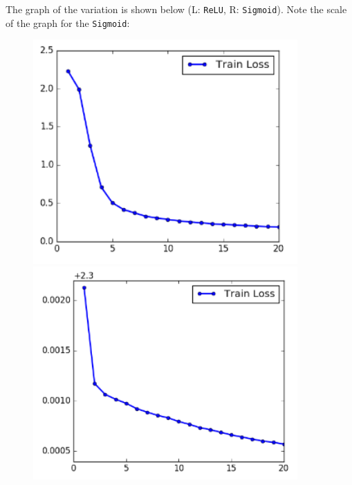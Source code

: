 \documentclass{article}
\begin{document}
\begin{flushleft}
The graph of the variation is shown below (L: \texttt{ReLU}, R: \texttt{Sigmoid}). Note the scale of the graph for the \texttt{Sigmoid}:
\begin{figure}[H]
\begin{minipage}{0.49\linewidth}
\centering
\includegraphics[width=0.9\textwidth]{train_loss_relu.png}
\end{minipage}
\hfill
\begin{minipage}{0.49\linewidth}
\centering
\includegraphics[width=0.9\textwidth]{train_loss_sigmoid.png}
\end{minipage}
\end{figure}
\end{flushleft}
\end{document}
